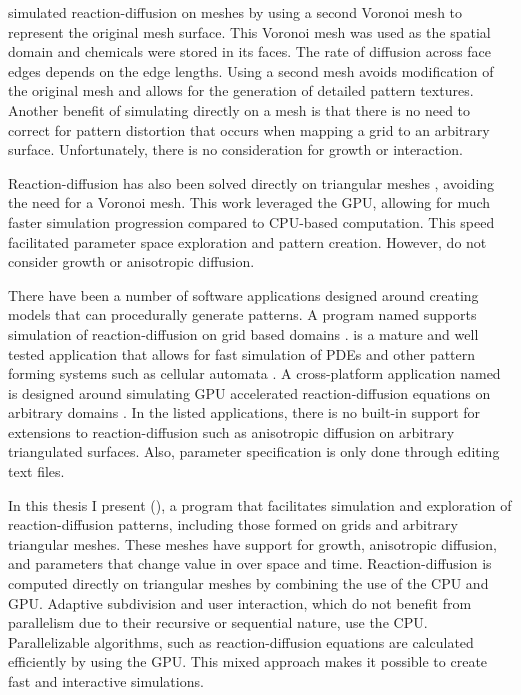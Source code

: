 \citet{turk1991} simulated reaction-diffusion on meshes by using a second Voronoi mesh to represent the original mesh surface. This Voronoi mesh was used as the spatial domain and chemicals were stored in its faces. The rate of diffusion across face edges depends on the edge lengths. Using a second mesh avoids modification of the original mesh and allows for the generation of detailed pattern textures. Another benefit of simulating directly on a mesh is that there is no need to correct for pattern distortion that occurs when mapping a grid to an arbitrary surface. Unfortunately, there is no consideration for growth or interaction. %

Reaction-diffusion has also been solved directly on triangular meshes \citep{descombes2016}, avoiding the need for a Voronoi mesh. This work leveraged the GPU, allowing for much faster simulation progression compared to CPU-based computation. This speed facilitated parameter space exploration and pattern creation. However, \citet{descombes2016} do not consider growth or anisotropic diffusion.

There have been a number of software applications designed around creating models that can procedurally generate patterns. A program named  supports simulation of reaction-diffusion on grid based domains \citep{texrd2019}.  is a mature and well tested application that allows for fast simulation of PDEs and other pattern forming systems such as cellular automata \citep{netlogo1999}. A cross-platform application named  is designed around simulating GPU accelerated reaction-diffusion equations on arbitrary domains \citep{ready2012}. In the listed applications, there is no built-in support for extensions to reaction-diffusion such as anisotropic diffusion on arbitrary triangulated surfaces. Also, parameter specification is only done through editing text files.

In this thesis I present  (\ProgramName{}), a program that facilitates simulation and exploration of reaction-diffusion patterns, including those formed on grids and arbitrary triangular meshes. These meshes have support for growth, anisotropic diffusion, and parameters that change value in over space and time. Reaction-diffusion is computed directly on triangular meshes by combining the use of the CPU and GPU. Adaptive subdivision and user interaction, which do not benefit from parallelism due to their recursive or sequential nature, use the CPU. Parallelizable algorithms, such as reaction-diffusion equations are calculated efficiently by using the GPU. This mixed approach makes it possible to create fast and interactive simulations. 

